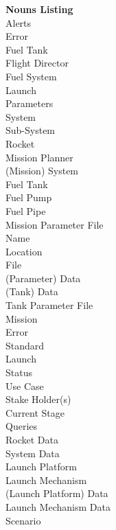 \documentclass[letterpaper]{article}
\begin{document}
\textbf{Nouns Listing}\\
Alerts\\
Error\\
Fuel Tank\\
Flight Director\\
Fuel System\\
Launch\\
Parameters\\
System\\
Sub-System\\
Rocket\\
Mission Planner\\
(Mission) System\\
Fuel Tank\\
Fuel Pump\\
Fuel Pipe\\
Mission Parameter File\\
Name\\
Location\\
File\\
(Parameter) Data\\
(Tank) Data\\
Tank Parameter File\\
Mission\\
Error\\
Standard\\
Launch\\
Status\\
Use Case\\
Stake Holder(s)\\
Current Stage\\
Queries\\
Rocket Data\\
System Data\\
Launch Platform\\
Launch Mechanism\\
(Launch Platform) Data\\
Launch Mechanism Data\\
Scenario\\
\end{document}
